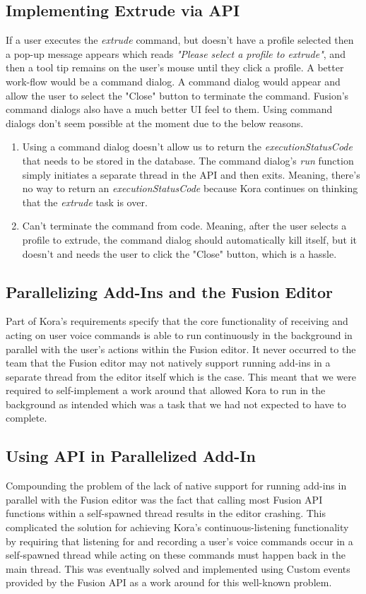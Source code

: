 \documentclass[onecolumn, draftclsnofoot,10pt, compsoc]{IEEEtran}
\begin{document}
	\subsection{Implementing Extrude via API}
		If a user executes the \textit{extrude} command, but doesn't have a profile selected then a pop-up message appears which reads \textit{"Please select a profile to extrude"}, and then a tool tip remains on the user's mouse until they click a profile.
		A better work-flow would be a command dialog.
		A command dialog would appear and allow the user to select the "Close" button to terminate the command. Fusion's command dialogs also have a much better UI feel to them. 
		Using command dialogs don't seem possible at the moment due to the below reasons.
		\begin{enumerate}
			\item Using a command dialog doesn't allow us to return the \textit{executionStatusCode} that needs to be stored in the database. The command dialog's \textit{run} function simply initiates a separate thread in the API and then exits.
			Meaning, there's no way to return an \textit{executionStatusCode} because Kora continues on thinking that the \textit{extrude} task is over.
			
			\item Can't terminate the command from code. Meaning, after the user selects
			a profile to extrude, the command dialog should automatically kill itself,
			but it doesn't and needs the user to click the "Close" button, which is a hassle.
		\end{enumerate}

   	 \subsection{Parallelizing Add-Ins and the Fusion Editor}
		Part of Kora's requirements specify that the core functionality of receiving and acting on user voice commands is able to run continuously in the background in parallel with the user's actions within the Fusion editor.
		It never occurred to the team that the Fusion editor may not natively support running add-ins in a separate thread from the editor itself which is the case.
		This meant that we were required to self-implement a work around that allowed Kora to run in the background as intended which was a task that we had not expected to have to complete.


	\subsection{Using API in Parallelized Add-In}
		Compounding the problem of the lack of native support for running add-ins in parallel with the Fusion editor was the fact that calling most Fusion API functions within a self-spawned thread results in the editor crashing.
		This complicated the solution for achieving Kora's continuous-listening functionality by requiring that listening for and recording a user's voice commands occur in a self-spawned thread while acting on these commands must happen back in the main thread.
		This was eventually solved and implemented using Custom events provided by the Fusion API as a work around for this well-known problem.
\end{document}
